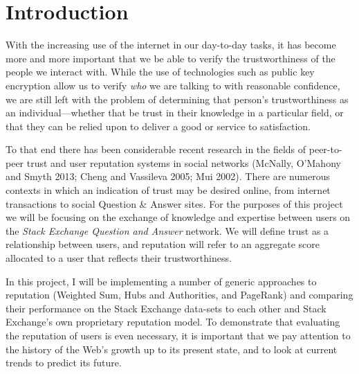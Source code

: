 \documentclass[]{final_report}
\begin{document}



\chapter{Introduction}

With the increasing use of the internet in our day-to-day tasks, it has become more and more important that we be able to verify the trustworthiness of the people we interact with. While the use of technologies such as public key encryption allow us to verify \textsl{who} we are talking to with reasonable confidence, we are still left with the problem of determining that person's trustworthiness as an individual---whether that be trust in their knowledge in a particular field, or that they can be relied upon to deliver a good or service to satisfaction.

To that end there has been considerable recent research in the fields of peer-to-peer trust and user reputation systems in social networks (McNally, O'Mahony and Smyth 2013; Cheng and Vassileva 2005; Mui 2002). There are numerous contexts in which an indication of trust may be desired online, from internet transactions to social Question \& Answer sites. For the purposes of this project we will be focusing on the exchange of knowledge and expertise between users on the \textsl{Stack Exchange Question and Answer} network. We will define trust as a relationship between users, and reputation will refer to an aggregate score allocated to a user that reflects their trustworthiness.

In this project, I will be implementing a number of generic approaches to reputation (Weighted Sum, Hubs and Authorities, and PageRank) and comparing their performance on the Stack Exchange data-sets to each other and Stack Exchange's own proprietary reputation model. To demonstrate that evaluating the reputation of users is even necessary, it is important that we pay attention to the history of the Web's growth up to its present state, and to look at current trends to predict its future.
\end{document}
